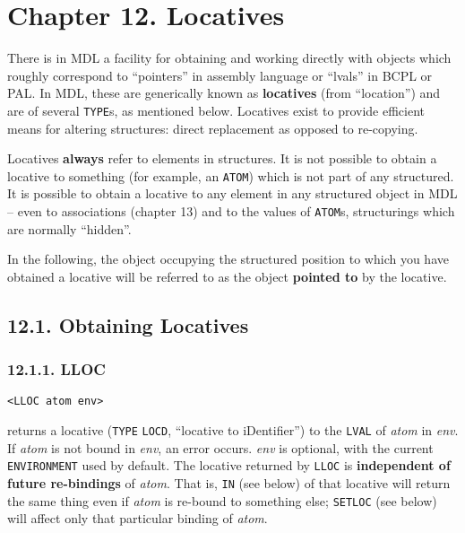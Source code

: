 \documentclass[a4paper,]{article}
\begin{document}
\section{Chapter 12. Locatives}\label{chapter-12.-locatives}

There is in MDL a facility for obtaining and working directly with objects which roughly correspond to ``pointers'' in
assembly language or ``lvals'' in BCPL or PAL. In MDL, these are generically known as \textbf{locatives} (from
``location'') and are of several \texttt{TYPE}s, as mentioned below. Locatives exist to provide efficient means for
altering structures: direct replacement as opposed to re-copying.

Locatives \textbf{always} refer to elements in structures. It is not possible to obtain a locative to something (for
example, an \texttt{ATOM}) which is not part of any structured. It is possible to obtain a locative to any element in any
structured object in MDL -- even to associations (chapter 13) and to the values of \texttt{ATOM}s, structurings which are
normally ``hidden''.

In the following, the object occupying the structured position to which you have obtained a locative will be referred to as
the object \textbf{pointed to} by the locative.

\subsection{12.1. Obtaining Locatives}\label{obtaining-locatives}

\subsubsection{12.1.1. LLOC}\label{lloc}

\begin{verbatim}
<LLOC atom env>
\end{verbatim}

 returns a locative (\texttt{TYPE} \texttt{LOCD}, ``locative to
iDentifier'') to the \texttt{LVAL}  of \emph{atom} in \emph{env}. If \emph{atom} is not bound in
\emph{env}, an error occurs. \emph{env} is optional, with the current \texttt{ENVIRONMENT} used by default. The locative
returned by \texttt{LLOC} is \textbf{independent of future re-bindings} of \emph{atom}. That is, \texttt{IN}
 (see below) of that locative will return the same thing even if \emph{atom} is re-bound to something
else; \texttt{SETLOC}  (see below) will affect only that particular binding of \emph{atom}.
\end{document}
